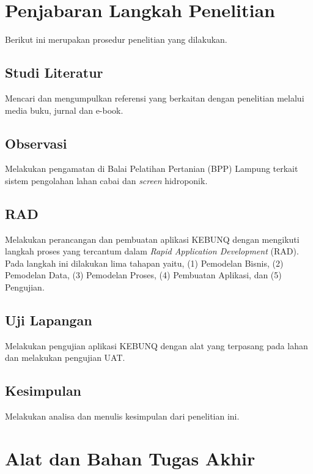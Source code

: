 \begin{flushleft}
\begin{justify}
      \section{Penjabaran Langkah Penelitian}
       Berikut ini merupakan prosedur penelitian yang dilakukan.
         \subsection{Studi Literatur}
         Mencari dan mengumpulkan referensi yang berkaitan dengan penelitian melalui media buku, jurnal dan e-book.\\
      
         \subsection{Observasi}
         Melakukan pengamatan di Balai Pelatihan Pertanian (BPP) Lampung terkait sistem pengolahan lahan cabai dan \emph{screen} hidroponik.\\
         \subsection{RAD}
         Melakukan perancangan dan pembuatan aplikasi KEBUNQ dengan mengikuti langkah proses yang tercantum dalam \textit{Rapid Application Development} (RAD). Pada langkah ini dilakukan lima tahapan yaitu, (1) Pemodelan Bisnis, (2) Pemodelan Data, (3) Pemodelan Proses, (4) Pembuatan Aplikasi, dan (5) Pengujian.\\
         \subsection{Uji Lapangan}
         Melakukan pengujian aplikasi KEBUNQ dengan alat yang terpasang pada lahan dan melakukan pengujian UAT.\\
         \subsection{Kesimpulan}
         Melakukan analisa dan menulis kesimpulan dari penelitian ini.\\

       \section{Alat dan Bahan Tugas Akhir}

\end{justify}
\end{flushleft}
